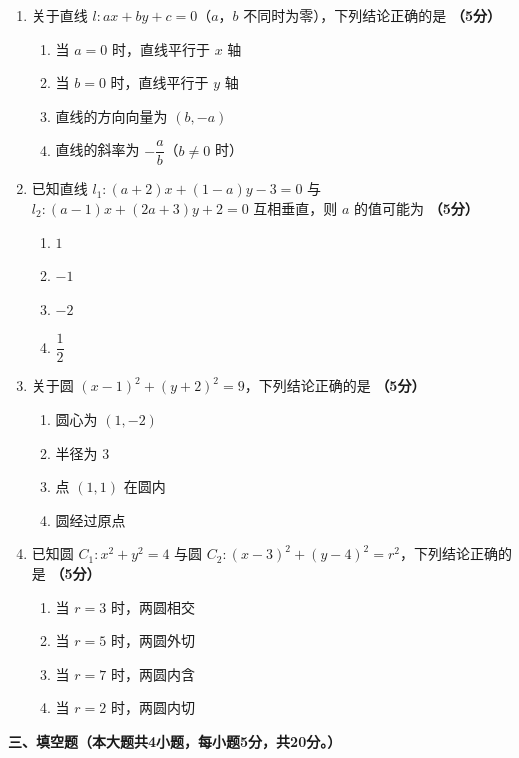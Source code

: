 \documentclass[12pt, a4paper]{ctexart}
\newcommand{\score}[1]{\hfill\textbf{（#1分）}}
\begin{document}
\begin{enumerate}[resume]
\item 关于直线 $l: ax+by+c=0$（$a$，$b$ 不同时为零），下列结论正确的是 \score{5}
\begin{enumerate}[label=\Alph*.]
\item 当 $a=0$ 时，直线平行于 $x$ 轴
\item 当 $b=0$ 时，直线平行于 $y$ 轴
\item 直线的方向向量为 $(b,-a)$
\item 直线的斜率为 $-\dfrac{a}{b}$（$b\neq 0$ 时）
\end{enumerate}

\item 已知直线 $l_1: (a+2)x+(1-a)y-3=0$ 与 $l_2: (a-1)x+(2a+3)y+2=0$ 互相垂直，则 $a$ 的值可能为 \score{5}
\begin{enumerate}[label=\Alph*.]
\item $1$
\item $-1$
\item $-2$
\item $\dfrac{1}{2}$
\end{enumerate}

\item 关于圆 $(x-1)^2+(y+2)^2=9$，下列结论正确的是 \score{5}
\begin{enumerate}[label=\Alph*.]
\item 圆心为 $(1,-2)$
\item 半径为 $3$
\item 点 $(1,1)$ 在圆内
\item 圆经过原点
\end{enumerate}

\item 已知圆 $C_1: x^2+y^2=4$ 与圆 $C_2: (x-3)^2+(y-4)^2=r^2$，下列结论正确的是 \score{5}
\begin{enumerate}[label=\Alph*.]
\item 当 $r=3$ 时，两圆相交
\item 当 $r=5$ 时，两圆外切
\item 当 $r=7$ 时，两圆内含
\item 当 $r=2$ 时，两圆内切
\end{enumerate}
\end{enumerate}

\vspace{1em}

\noindent\textbf{三、填空题（本大题共4小题，每小题5分，共20分。）}

\vspace{0.5em}
\end{document}
